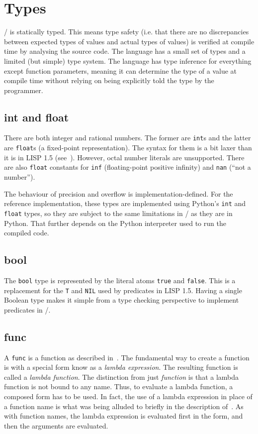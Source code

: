 \documentclass[a4paper, 12pt]{article}
\begin{document}
\section{Types}
\lispy/ is statically typed. This means type safety (i.e. that there are no discrepancies between expected types of values and actual types of values) is verified at compile time by analysing the source code. The language has  a small set of types and a limited (but simple) type system. The language has type inference for everything except function parameters, meaning it can determine the type of a value at compile time without relying on being explicitly told the type by the programmer.

\subsection{int and float}
There are both integer and rational numbers. The former are \texttt{int}s and the latter are \texttt{float}s (a fixed-point representation). The syntax for them is a bit laxer than it is in LISP 1.5 (see~). However, octal number literals are unsupported. There are also \texttt{float} constants for \texttt{inf} (floating-point positive infinity) and \texttt{nan} (``not a number'').

The behaviour of precision and overflow is implementation-defined. For the reference implementation, these types are implemented using Python's \texttt{int} and \texttt{float} types, so they are subject to the same limitations in \lispy/ as they are in Python. That further depends on the Python interpreter used to run the compiled code.

\subsection{bool}
The \texttt{bool} type is represented by the literal atoms \texttt{true} and \texttt{false}. This is a replacement for the \texttt{T} and \texttt{NIL} used by predicates in LISP 1.5. Having a single Boolean type makes it simple from a type checking perspective to implement predicates in \lispy/.

\subsection{func} \label{subsec:func}
A \texttt{func} is a function as described in~. The fundamental way to create a function is with a special form know as a \textit{lambda expression}. The resulting function is called a \textit{lambda function}. The distinction from just \textit{function} is that a lambda function is not bound to any name. Thus, to evaluate a lambda function, a composed form has to be used. In fact, the use of a lambda expression in place of a function name is what was being alluded to briefly in the description of~. As with function names, the lambda expression is evaluated first in the form, and then the arguments are evaluated.
\end{document}
